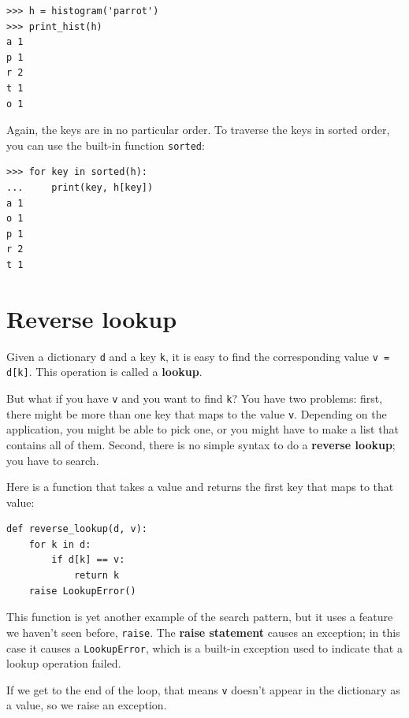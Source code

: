 \documentclass[10pt]{book}
\begin{document}
\begin{verbatim}
>>> h = histogram('parrot')
>>> print_hist(h)
a 1
p 1
r 2
t 1
o 1
\end{verbatim}
%
Again, the keys are in no particular order.  To traverse the keys
in sorted order, you can use the built-in function {\tt sorted}:

\begin{verbatim}
>>> for key in sorted(h):
...     print(key, h[key])
a 1
o 1
p 1
r 2
t 1
\end{verbatim}



\section{Reverse lookup}
\label{raise}

Given a dictionary {\tt d} and a key {\tt k}, it is easy to
find the corresponding value {\tt v = d[k]}.  This operation
is called a {\bf lookup}.

But what if you have {\tt v} and you want to find {\tt k}?
You have two problems: first, there might be more than one
key that maps to the value {\tt v}.  Depending on the application,
you might be able to pick one, or you might have to make
a list that contains all of them.  Second, there is no
simple syntax to do a {\bf reverse lookup}; you have to search.

Here is a function that takes a value and returns the first
key that maps to that value:

\begin{verbatim}
def reverse_lookup(d, v):
    for k in d:
        if d[k] == v:
            return k
    raise LookupError()
\end{verbatim}
%
This function is yet another example of the search pattern, but it
uses a feature we haven't seen before, {\tt raise}.  The
{\bf raise statement} causes an exception; in this case it causes a
{\tt LookupError}, which is a built-in exception used to indicate
that a lookup operation failed.
  
 

If we get to the end of the loop, that means {\tt v}
doesn't appear in the dictionary as a value, so we raise an
exception.
\end{document}
